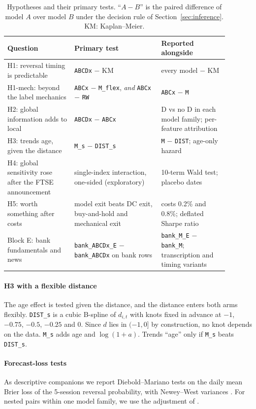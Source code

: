 \begin{table}[!htbp]
\centering
\caption{Hypotheses and their primary tests. ``$A-B$'' is the paired difference of model $A$ over
model $B$ under the decision rule of Section~\ref{sec:inference}. KM: Kaplan--Meier.}\label{tab:primary}
\small
\begin{tabular}{L{0.27\linewidth}L{0.35\linewidth}L{0.27\linewidth}}
\toprule
Question & Primary test & Reported alongside \\
\midrule
H1: reversal timing is predictable & \texttt{ABCDx} $-$ KM & every model $-$ KM \\
H1-mech: beyond the label mechanics & \texttt{ABCx} $-$ \texttt{M\_flex}, \emph{and}\newline
  \texttt{ABCx} $-$ \texttt{RW} & \texttt{ABCx} $-$ \texttt{M} \\
H2: global information adds to local & \texttt{ABCDx} $-$ \texttt{ABCx} & D vs no D in each model
  family; per-feature attribution \\
H3: trends age, given the distance & \texttt{M\_s} $-$ \texttt{DIST\_s} & \texttt{M} $-$ \texttt{DIST}; age-only
  hazard \\
H4: global sensitivity rose after the FTSE announcement & single-index interaction, one-sided
  (exploratory) & 10-term Wald test; placebo dates \\
H5: worth something after costs & model exit beats DC exit, buy-and-hold and mechanical exit &
  costs 0.2\% and 0.8\%; deflated Sharpe ratio \\
Block E: bank fundamentals and news & \texttt{bank\_ABCDx\_E} $-$ \texttt{bank\_ABCDx} on bank rows &
  \texttt{bank\_M\_E} $-$ \texttt{bank\_M}; transcription and timing variants \\
\bottomrule
\end{tabular}
\end{table}

\paragraph{H3 with a flexible distance} The age effect is tested given the distance, and the
distance enters both arms flexibly. \texttt{DIST\_s} is a cubic B-spline of $d_{i,t}$ with knots
fixed in advance at $-1$, $-0.75$, $-0.5$, $-0.25$ and $0$. Since $d$ lies in $(-1,0]$ by
construction, no knot depends on the data. \texttt{M\_s} adds age and $\log(1+a)$. Trends ``age''
only if \texttt{M\_s} beats \texttt{DIST\_s}.

\paragraph{Forecast-loss tests} As descriptive companions we report Diebold--Mariano tests
\citep{DieboldMariano1995} on the daily mean Brier loss of the 5-session reversal probability, with
Newey--West variances \citep{NeweyWest1987}. For nested pairs within one model family, we use the
adjustment of \citet{ClarkWest2007}.

